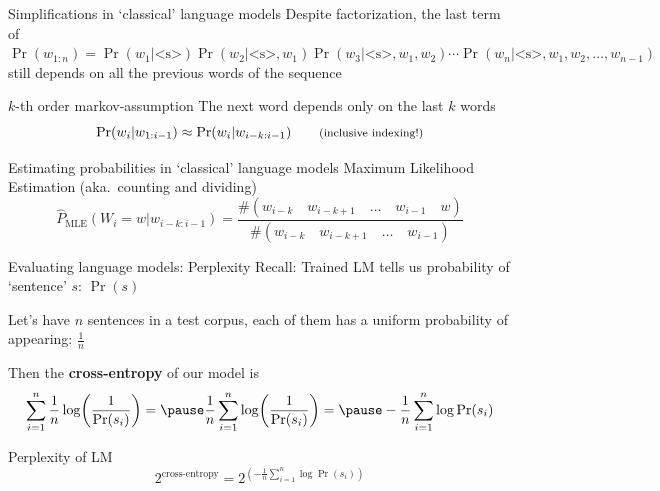 \documentclass[12pt,aspectratio=169,handout]{beamer}
\begin{document}
\begin{frame}{Simplifications in `classical' language models}
	Despite factorization, the last term of
	$
\Pr(w_{1:n}) = \Pr(w_1 | \text{<s>}) \Pr (w_2 | \text{<s>}, w_1) \Pr(w_3 | \text{<s>}, w_1, w_2) \cdots \Pr(w_n | \text{<s>}, w_1, w_2, \ldots, w_{n-1})
	$
	still depends on all the previous words of the sequence
	
	\begin{block}{$k$-th order markov-assumption}
		The next word depends only on the last $k$ words
		$$
		\Pr(w_{i} | w_{1:i-1}) \approx \Pr (w_{i} | w_{i-k:i-1}) \qquad \text{\footnotesize{(inclusive indexing!)}}
		$$
	\end{block}
\end{frame}

\begin{frame}{Estimating probabilities in `classical' language models}
	Maximum Likelihood Estimation (aka.\ counting and dividing)
	$$
	\hat{P}_{\text{MLE}}(W_i = w | w_{i - k:i - 1}) = \frac{\#(w_{i-k} \quad w_{i-k+1} \quad \ldots \quad w_{i-1} \quad w)}{\#(w_{i-k} \quad w_{i-k+1} \quad \ldots \quad w_{i-1})}
	$$
	
\end{frame}


\begin{frame}{Evaluating language models: Perplexity}
	Recall: Trained LM tells us probability of `sentence' $s$: $\Pr(s)$
	
	\pause
	Let's have $n$ sentences in a test corpus, each of them has a uniform probability of appearing: $\frac{1}{n}$
	
	\pause
	Then the \textbf{cross-entropy}  of our model is
	$$
	\sum_{i = 1}^{n} \frac{1}{n} \log (\frac{1}{\Pr(s_i)}) = \pause
	\frac{1}{n} \sum_{i = 1}^{n} \log (\frac{1}{\Pr(s_i)}) = \pause
	- \frac{1}{n} \sum_{i = 1}^{n} \log \Pr(s_i)
	$$
	\pause \begin{block}{Perplexity of LM}
		$$
		2^{\text{cross-entropy}} = 
		2^{\left(- \frac{1}{n} \sum_{i = 1}^{n} \log \Pr(s_i)\right)}
		$$
	\end{block}
	
\end{frame}
\end{document}
